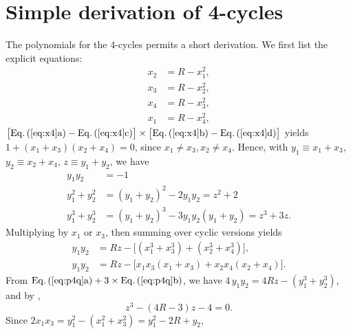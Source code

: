 \documentclass[preprint]{revtex4-1}
\begin{document}
\appendix



\section{\label{apd:per4}Simple derivation of 4-cycles}



The polynomials for the 4-cycles permits a short derivation.
We first list the explicit equations:
%
%
%
\begin{subequations}
\label{eq:x4}
\begin{align}
  x_2 &= R - x_1^2, \\
  x_3 &= R - x_2^2, \\
  x_4 &= R - x_3^2, \\
  x_1 &= R - x_4^2,
\end{align}
\end{subequations}
%
$\big[\mathrm{\refeqsub{x4}{a}} - \mathrm{\refeqsub{x4}{c}}\big]
\times
\big[\mathrm{\refeqsub{x4}{b}} - \mathrm{\refeqsub{x4}{d}}\big]$
yields $1 + (x_1 + x_3) (x_2 + x_4) = 0$,
since $x_1 \ne x_3, x_2 \ne x_4$.
%
Hence, with
$y_1 \equiv x_1 + x_3$, $y_2 \equiv x_2 + x_4$,
$z \equiv y_1 + y_2$,
we have
%
%
%
\begin{subequations}
\begin{align}
y_1 y_2       &= -1 \\
y_1^2 + y_2^2 & = (y_1 + y_2)^2 - 2 y_1 y_2 = z^2 + 2 \\
y_1^3 + y_2^3 & = (y_1 + y_2)^3 - 3 y_1 y_2 (y_1 + y_2) = z^3 + 3 z.
\end{align}
\label{eq:ypow4}
\end{subequations}
%
%
Multiplying  by $x_1$ or $x_3$,
then summing over cyclic versions yields
\begin{subequations}
\begin{align}
y_1 y_2 &= R z - \big[(x_1^3 + x_3^3) + (x_2^3 + x_4^3)\big],\\
y_1 y_2 &= R z - \big[x_1 x_3 (x_1 + x_3) + x_2 x_4 (x_2 + x_4)\big].
\end{align}
\label{eq:p4q}
\end{subequations}
%
From
$\mathrm{\refeqsub{p4q}{a}} + 3 \times \mathrm{\refeqsub{p4q}{b}}$,
we have
$4 \, y_1 y_2 = 4 R z - (y_1^3 + y_2^3)$,
%
and by ,
\begin{equation}
  z^3 - (4 R - 3) z - 4 = 0.
  \label{eq:xr4s}
\end{equation}
%
%
Since $2 x_1 x_3 = y_1^2 - (x_1^2 + x_3^2) = y_1^2 - 2 R + y_2$,
\end{document}
